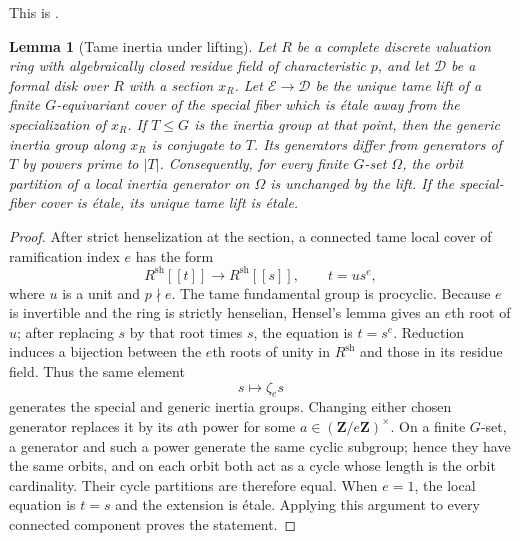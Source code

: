 \documentclass[10pt,a4paper]{amsart}
\newtheorem{lemma}[theorem]{Lemma}
\numberwithin{equation}{section}
\begin{document}
This is \cite[Definition~2.13]{WewersThree}.

\begin{lemma}[Tame inertia under lifting]\label{lem:tame-profile}
Let $R$ be a complete discrete valuation ring with algebraically closed
residue field of characteristic $p$, and let $\mathcal D$ be a formal disk
over $R$ with a section $x_R$.  Let
$\mathcal E\to\mathcal D$ be the unique tame lift of a finite
$G$-equivariant cover of the special fiber which is \'etale away from the
specialization of $x_R$.  If $T\leq G$ is the inertia group at that point,
then the generic inertia group along $x_R$ is conjugate to $T$.  Its
generators differ from generators of $T$ by powers prime to $|T|$.
Consequently, for every finite $G$-set $\Omega$, the orbit partition of a
local inertia generator on $\Omega$ is unchanged by the lift.  If the
special-fiber cover is \'etale, its unique tame lift is \'etale.
\end{lemma}

\begin{proof}
After strict henselization at the section, a connected tame local cover of
ramification index $e$ has the form
\[
 R^{\mathrm{sh}}[[t]]\longrightarrow R^{\mathrm{sh}}[[s]],
 \qquad t=u s^e,
\]
where $u$ is a unit and $p\nmid e$.  The tame fundamental group is
procyclic.  Because $e$ is invertible and the ring is strictly henselian,
Hensel's lemma gives an $e$th root of $u$; after replacing $s$ by that root
times $s$, the equation is $t=s^e$.  Reduction induces a bijection between
the $e$th roots of unity in $R^{\mathrm{sh}}$ and those in its residue
field.  Thus the same element
\[
 s\longmapsto\zeta_e s
\]
generates the special and generic inertia groups.  Changing either chosen
generator replaces it by its $a$th power for some
$a\in(\mathbf Z/e\mathbf Z)^\times$.  On a finite $G$-set, a generator and
such a power generate the same cyclic subgroup; hence they have the same
orbits, and on each orbit both act as a cycle whose length is the orbit
cardinality.  Their cycle partitions are therefore equal.  When $e=1$, the
local equation is $t=s$ and the extension is \'etale.  Applying this argument
to every connected component proves the statement.
\end{proof}
\end{document}
